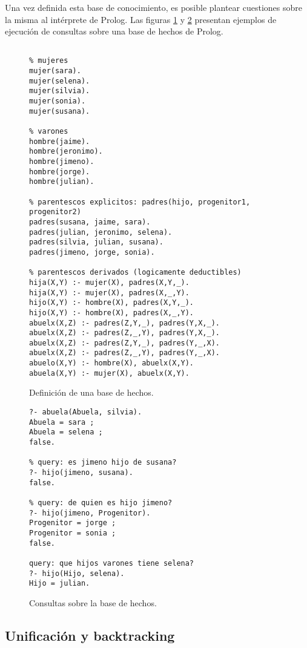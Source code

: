 \documentclass[11pt,captions=nooneline,DIV=14, parskip=full]{scrartcl}
\begin{document}
Una vez definida esta base de conocimiento, es posible plantear cuestiones sobre la misma al intérprete de Prolog. Las figuras \ref{fig:basehechos} y \ref{fig:queries} presentan ejemplos de ejecución de consultas sobre una base de hechos de Prolog.

\begin{figure}[p]
\label{fig:basehechos}
\lstset{language=Prolog}
\begin{lstlisting}[frame=single]
% base de hechos

% mujeres
mujer(sara).
mujer(selena).
mujer(silvia).
mujer(sonia).
mujer(susana).

% varones
hombre(jaime).
hombre(jeronimo).
hombre(jimeno).
hombre(jorge).
hombre(julian).

% parentescos explicitos: padres(hijo, progenitor1, progenitor2)
padres(susana, jaime, sara).
padres(julian, jeronimo, selena).
padres(silvia, julian, susana).
padres(jimeno, jorge, sonia).

% parentescos derivados (logicamente deductibles)
hija(X,Y) :- mujer(X), padres(X,Y,_).
hija(X,Y) :- mujer(X), padres(X,_,Y).
hijo(X,Y) :- hombre(X), padres(X,Y,_).
hijo(X,Y) :- hombre(X), padres(X,_,Y).
abuelx(X,Z) :- padres(Z,Y,_), padres(Y,X,_).
abuelx(X,Z) :- padres(Z,_,Y), padres(Y,X,_).
abuelx(X,Z) :- padres(Z,Y,_), padres(Y,_,X).
abuelx(X,Z) :- padres(Z,_,Y), padres(Y,_,X).
abuelo(X,Y) :- hombre(X), abuelx(X,Y).
abuela(X,Y) :- mujer(X), abuelx(X,Y).
\end{lstlisting} 
\caption{Definición de una base de hechos.}
\end{figure}

\begin{figure}[p]
\label{fig:queries}
\lstset{language=Prolog}
\begin{lstlisting}[frame=single]
% query: quien es abuela de silvia?
?- abuela(Abuela, silvia).
Abuela = sara ;
Abuela = selena ;
false.

% query: es jimeno hijo de susana?
?- hijo(jimeno, susana).
false.

% query: de quien es hijo jimeno?
?- hijo(jimeno, Progenitor).
Progenitor = jorge ;
Progenitor = sonia ;
false.

query: que hijos varones tiene selena?
?- hijo(Hijo, selena).
Hijo = julian.
\end{lstlisting} 
\caption{Consultas sobre la base de hechos.}
\end{figure}

\subsection{Unificación y backtracking}
\end{document}
